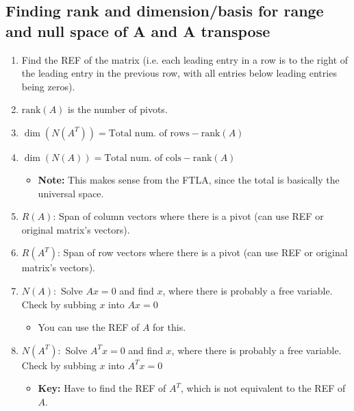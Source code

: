 \subsection{Finding rank and dimension/basis for range and null space of A and A transpose}
\begin{process}
    \begin{enumerate}
        \item Find the REF of the matrix (i.e.  each leading entry in a row is to the right of the leading entry in the previous row, with all entries below leading entries being zeros).
        \item $\text{rank}(A)$ is the number of pivots. 
        \item $\dim (N(A^T)) = \text{Total num. of rows} - \text{rank}(A)$
        \item $\dim (N(A)) = \text{Total num. of cols} - \text{rank}(A)$
        \begin{itemize}
            \item \textbf{Note:} This makes sense from the FTLA, since the total is basically the universal space. 
        \end{itemize}
        \item $R(A)$: Span of column vectors where there is a pivot (can use REF or original matrix's vectors).
        \item $R(A^T)$: Span of row vectors where there is a pivot (can use REF or original matrix's vectors).
        \item $N(A):$ Solve $Ax=0$ and find $x$, where there is probably a free variable. Check by subbing $x$ into $Ax=0$
        \begin{itemize}
            \item You can use the REF of $A$ for this. 
        \end{itemize}
        \item $N(A^T):$ Solve $A^T x=0$ and find $x$, where there is probably a free variable. Check by subbing $x$ into $A^Tx=0$
        \begin{itemize}
            \item \textbf{Key:} Have to find the REF of $A^T$, which is not equivalent to the REF of $A$.
        \end{itemize}
    \end{enumerate}
\end{process}